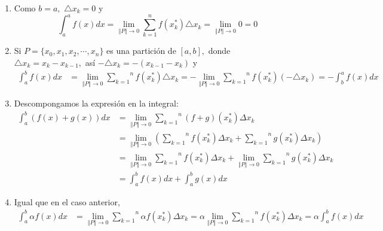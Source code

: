 \begin{enumerate}[leftmargin=1.2em,   itemindent=0pt,       labelwidth=\labelwidth,labelsep=0.5em,]
\item Como $b=a,$ $\triangle x_{k}=0$ y
{\small
\[
\int_{a}^{a}f\left( x\right) dx=\underset{\left\Vert P\right\Vert
 \rightarrow 0}{\lim }\overset{n}{\underset{k=1}{\sum }}f(x_{k}^{\ast
})\triangle x_{k}=\underset{\left\Vert P\right\Vert \rightarrow 0}{\lim }0=0
\]
}

\item Si $P=\{x_{0},x_{1},x_{2},\cdots ,x_{n}\}$ es una partición de $\left[
a,b\right] ,$ donde $\triangle x_{k}=x_{k}-x_{k-1},$ así $-\triangle x_{k}=-\left( x_{k-1}-x_{k}\right) $ y
{\footnotesize
\begin{align*}
\int_{a}^{b}f\left( x\right) dx&=\underset{\left\Vert P\right\Vert
 \rightarrow 0}{\lim }\overset{n}{\underset{k=1}{\sum }}f(x_{k}^{\ast
})\triangle x_{k}%
=-\underset{\left\Vert P\right\Vert \rightarrow 0}{\lim }%
\overset{n}{\underset{k=1}{\sum }}f(x_{k}^{\ast })\left( -\triangle
x_{k}\right) =-\int_{b}^{a}f\left( x\right) dx
\end{align*}
}

\item Descompongamos la expresión en la integral:
{\small
\begin{align*}
\int_{a}^{b}\left( f(x)+g(x)\right) dx&=\underset{\left\Vert
P\right\Vert \rightarrow 0}{\lim }\overset{n}{\underset{k=1}{\sum }}\left(
f+g\right) (x_{k}^{\ast })\Delta x_{k}\\
&=\underset{\left\Vert P\right\Vert
\rightarrow 0}{\lim }\left( \overset{n}{\underset{k=1}{\sum }}f(x_{k}^{\ast
})\Delta x_{k}+\overset{n}{\underset{k=1}{\sum }}g(x_{k}^{\ast
})\Delta x_{k}\right)\\
&=\underset{\left\Vert P\right\Vert
\rightarrow 0}{\lim }\overset{n}{\underset{k=1}{\sum }}f(x_{k}^{\ast
})\Delta x_{k}+\underset{\left\Vert P\right\Vert \rightarrow 0}{\lim }%
\overset{n}{\underset{k=1}{\sum }}g(x_{k}^{\ast })\Delta x_{k}\\
&=\int_{a}^{b}f(x)dx+\int_{a}^{b}g(x)dx
\end{align*}
}

\item Igual que en el caso anterior,
{\footnotesize
\begin{align*}
\int_{a}^{b}\alpha f(x)dx&=\underset{\left\Vert P\right\Vert \rightarrow 0%
}{\lim }\overset{n}{\underset{k=1}{\sum }}\alpha f(x_{k}^{\ast })\Delta
x_{k}%
=\alpha \underset{\left\Vert P\right\Vert \rightarrow 0%
}{\lim }\overset{n}{\underset{k=1}{\sum }}f(x_{k}^{\ast })\Delta x_{k}
=\alpha \int_{a}^{b}f(x)dx
\end{align*}
}


\end{enumerate}
